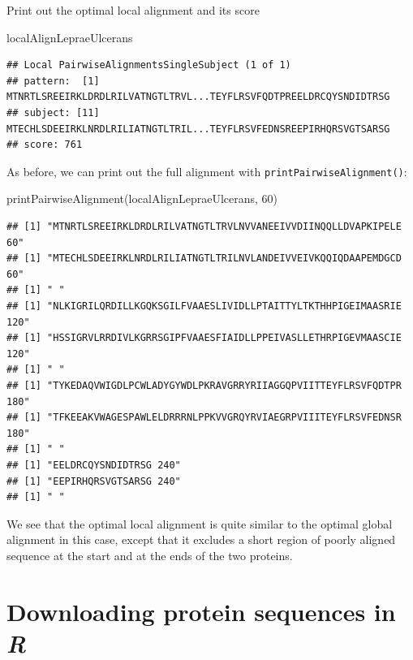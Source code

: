 \documentclass[
]{book}
\newenvironment{Shaded}{\begin{snugshade}}{\end{snugshade}}
\newcommand{\DecValTok}[1]{\textcolor[rgb]{0.00,0.00,0.81}{#1}}
\newcommand{\FunctionTok}[1]{\textcolor[rgb]{0.00,0.00,0.00}{#1}}
\newcommand{\NormalTok}[1]{#1}
\begin{document}
Print out the optimal local alignment and its score

\begin{Shaded}
\begin{Highlighting}[]
\NormalTok{localAlignLepraeUlcerans }
\end{Highlighting}
\end{Shaded}

\begin{verbatim}
## Local PairwiseAlignmentsSingleSubject (1 of 1)
## pattern:  [1] MTNRTLSREEIRKLDRDLRILVATNGTLTRVL...TEYFLRSVFQDTPREELDRCQYSNDIDTRSG
## subject: [11] MTECHLSDEEIRKLNRDLRILIATNGTLTRIL...TEYFLRSVFEDNSREEPIRHQRSVGTSARSG
## score: 761
\end{verbatim}

As before, we can print out the full alignment with \texttt{printPairwiseAlignment()}:

\begin{Shaded}
\begin{Highlighting}[]
\FunctionTok{printPairwiseAlignment}\NormalTok{(localAlignLepraeUlcerans, }\DecValTok{60}\NormalTok{)}
\end{Highlighting}
\end{Shaded}

\begin{verbatim}
## [1] "MTNRTLSREEIRKLDRDLRILVATNGTLTRVLNVVANEEIVVDIINQQLLDVAPKIPELE 60"
## [1] "MTECHLSDEEIRKLNRDLRILIATNGTLTRILNVLANDEIVVEIVKQQIQDAAPEMDGCD 60"
## [1] " "
## [1] "NLKIGRILQRDILLKGQKSGILFVAAESLIVIDLLPTAITTYLTKTHHPIGEIMAASRIE 120"
## [1] "HSSIGRVLRRDIVLKGRRSGIPFVAAESFIAIDLLPPEIVASLLETHRPIGEVMAASCIE 120"
## [1] " "
## [1] "TYKEDAQVWIGDLPCWLADYGYWDLPKRAVGRRYRIIAGGQPVIITTEYFLRSVFQDTPR 180"
## [1] "TFKEEAKVWAGESPAWLELDRRRNLPPKVVGRQYRVIAEGRPVIIITEYFLRSVFEDNSR 180"
## [1] " "
## [1] "EELDRCQYSNDIDTRSG 240"
## [1] "EEPIRHQRSVGTSARSG 240"
## [1] " "
\end{verbatim}

We see that the optimal local alignment is quite similar to the optimal global alignment in this case, except that it excludes a short region of poorly aligned sequence at the start and at the ends of the two proteins.

\hypertarget{downloading-protein-sequences-in-r}{%
\chapter{\texorpdfstring{Downloading protein sequences in \emph{R}}{Downloading protein sequences in R}}\label{downloading-protein-sequences-in-r}}
\end{document}
